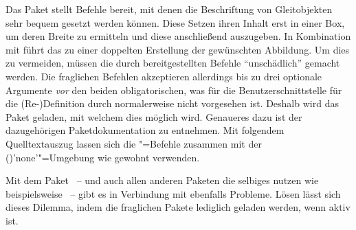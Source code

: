 Das Paket  stellt Befehle bereit, mit denen die Beschriftung 
von Gleitobjekten sehr bequem gesetzt werden können. Diese Setzen ihren Inhalt 
erst in einer Box, um deren Breite zu ermitteln und diese anschließend 
auszugeben. In Kombination mit  führt das zu einer 
doppelten Erstellung der gewünschten Abbildung. Um dies zu vermeiden, müssen 
die durch  bereitgestellten Befehle \enquote{unschädlich} 
gemacht werden. Die fraglichen Befehlen akzeptieren allerdings bis zu drei 
optionale Argumente \emph{vor} den beiden obligatorischen, was für die 
Benutzerschnittstelle für die (Re-)Definition durch  
normalerweise nicht vorgesehen ist. Deshalb wird das Paket  
geladen, mit welchem dies möglich wird. Genaueres dazu ist der dazugehörigen 
Paketdokumentation zu entnehmen. Mit folgendem Quelltextauszug lassen sich die 
"=Befehle zusammen mit der 
()'none'"=Umgebung wie gewohnt 
verwenden.
%
\begin{quoting}
\begin{Code}
\usepackage{floatrow}
\usepackage{xparse}
\ifpdf\else
\fi
\end{Code}
\end{quoting}

Mit dem Paket ~-- und auch allen anderen Paketen die 
selbiges nutzen wie beispielsweise ~-- gibt es in Verbindung 
mit  ebenfalls Probleme. Lösen lässt sich dieses Dilemma, 
indem die fraglichen Pakete lediglich geladen werden, wenn  
aktiv ist.
%
\begin{quoting}[rightmargin=0pt]
\begin{Code}
\ifpdf
  \usepackage{tikz}%
\fi
\end{Code}
\end{quoting}
